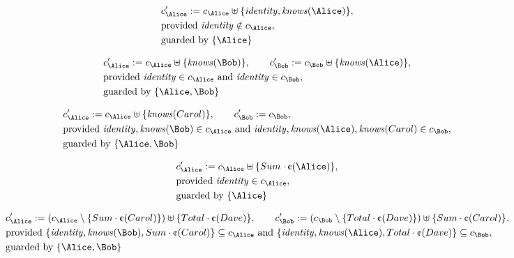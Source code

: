 \begin{align*}
&
c'_
{
\Alice
}
 := 
c_
{
\Alice
}
 \uplus 
\{
\mathit{
identity
}
,
\mathit{
knows
}
(
\Alice
)
\}
,\\
&
\text{provided } 
\mathit{
identity
}
 \notin c_
{
\Alice
}
,\\
&
\text{guarded by } \{
\Alice
\}
\end{align*}

\begin{align*}
&
c'_
{
\Alice
}
 := 
c_
{
\Alice
}
 \uplus 
\{
\mathit{
knows
}
(
\Bob
)
\}
, \qquad 
c'_
{
\Bob
}
 := 
c_
{
\Bob
}
 \uplus 
\{
\mathit{
knows
}
(
\Alice
)
\}
,\\
&
\text{provided } 
\mathit{
identity
}
 \in c_
{
\Alice
}
 \text{ and } 
\mathit{
identity
}
 \in c_
{
\Bob
}
,\\
&
\text{guarded by } \{
\Alice
,
\Bob
\}
\end{align*}

\begin{align*}
&
c'_
{
\Alice
}
 := 
c_
{
\Alice
}
 \uplus 
\{
\mathit{
knows
}
(
Carol
)
\}
, \qquad 
c'_
{
\Bob
}
 := 
c_
{
\Bob
}
,\\
&
\text{provided } 
\mathit{
identity
}
,
\mathit{
knows
}
(
\Bob
)
 \in c_
{
\Alice
}
 \text{ and } 
\mathit{
identity
}
,
\mathit{
knows
}
(
\Alice
)
,
\mathit{
knows
}
(
Carol
)
 \in c_
{
\Bob
}
,\\
&
\text{guarded by } \{
\Alice
,
\Bob
\}
\end{align*}

\begin{align*}
&
c'_
{
\Alice
}
 := 
c_
{
\Alice
}
 \uplus 
\{
Sum
\cdot
\text{\textcent}
(
\Alice
)
\}
,\\
&
\text{provided } 
\mathit{
identity
}
 \in c_
{
\Alice
}
,\\
&
\text{guarded by } \{
\Alice
\}
\end{align*}

\begin{align*}
&
c'_
{
\Alice
}
 := 
(c_
{
\Alice
}
 \setminus 
\{
Sum
\cdot
\text{\textcent}
(
Carol
)
\}
) \uplus 
\{
Total
\cdot
\text{\textcent}
(
Dave
)
\}
, \qquad 
c'_
{
\Bob
}
 := 
(c_
{
\Bob
}
 \setminus 
\{
Total
\cdot
\text{\textcent}
(
Dave
)
\}
) \uplus 
\{
Sum
\cdot
\text{\textcent}
(
Carol
)
\}
,\\
&
\text{provided } 
\{
\mathit{
identity
}
,
\mathit{
knows
}
(
\Bob
)
,
Sum
\cdot
\text{\textcent}
(
Carol
)
\}
 \subseteq c_
{
\Alice
}
 \text{ and } 
\{
\mathit{
identity
}
,
\mathit{
knows
}
(
\Alice
)
,
Total
\cdot
\text{\textcent}
(
Dave
)
\}
 \subseteq c_
{
\Bob
}
,\\
&
\text{guarded by } \{
\Alice
,
\Bob
\}
\end{align*}
